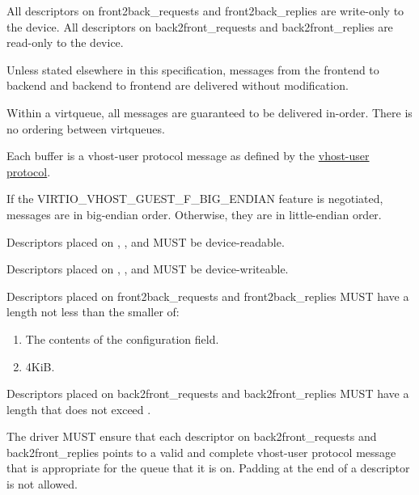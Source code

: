All descriptors on front2back_requests and front2back_replies are
write-only to the device. All descriptors on back2front_requests
and back2front_replies are read-only to the device.

Unless stated elsewhere in this specification, messages from the
frontend to backend and backend to frontend are delivered without
modification.

Within a virtqueue, all messages are guaranteed to be delivered
in-order. There is no ordering between virtqueues.

Each buffer is a vhost-user protocol message as defined by
the \hyperref[intro:Vhost-user Protocol]{vhost-user protocol}.

If the VIRTIO_VHOST_GUEST_F_BIG_ENDIAN feature is negotiated,
messages are in big-endian order. Otherwise, they are in
little-endian order.


Descriptors placed on ,
, and  MUST be
device-readable.

Descriptors placed on ,
, and  MUST be
device-writeable.

Descriptors placed on front2back_requests and front2back_replies
MUST have a length not less than the smaller of:

\begin{enumerate}
\item The contents of the 
      configuration field.
\item 4KiB.
\end{enumerate}

Descriptors placed on back2front_requests and back2front_replies
MUST have a length that does not exceed .

The driver MUST ensure that each descriptor on back2front_requests
and back2front_replies points to a valid and complete vhost-user
protocol message that is appropriate for the queue that it is on.
Padding at the end of a descriptor is not allowed.



